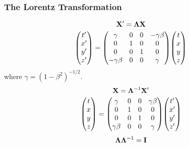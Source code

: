 \documentclass[a4paper]{article}
\numberwithin{equation}{section}
\begin{document}
\subsubsection{The Lorentz Transformation}
\begin{equation}\label{key}
\vb{X}' = \bm{\Lambda}\vb{X}
\end{equation}
\begin{equation}\label{key}
\mqty(t'\\x'\\y'\\z') 
= \mqty(\gamma & 0 & 0 & -\gamma\beta\\
        0 & 1 & 0 & 0\\
        0 & 0 & 1 & 0\\
        -\gamma\beta & 0 & 0 & \gamma)
  \mqty(t\\x\\y\\z)
\end{equation}
where $ \gamma = (1 - \beta^2)^{-1/2} $.
\begin{equation}\label{key}
\vb{X} = \bm{\Lambda}^{-1}\vb{X}'
\end{equation}
\begin{equation}\label{key}
\mqty(t\\x\\y\\z) 
= \mqty(\gamma & 0 & 0 & \gamma\beta\\
0 & 1 & 0 & 0\\
0 & 0 & 1 & 0\\
\gamma\beta & 0 & 0 & \gamma)
\mqty(t'\\x'\\y'\\z')
\end{equation}
\begin{equation}\label{key}
\bm{\Lambda}\bm{\Lambda}^{-1} = \vb{I}
\end{equation}
\end{document}
